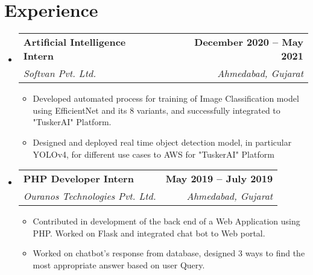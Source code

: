 \documentclass[letterpaper,11pt]{article}
\makeatletter
\newcommand{\resumeItem}[1]{
  \item\small{
    {#1 \vspace{-2pt}}
  }
}
\newcommand{\resumeSubheading}[4]{
  \vspace{-2pt}\item
    \begin{tabular*}{1.0\textwidth}[t]{l@{\extracolsep{\fill}}r}
      \textbf{#1} & \textbf{\small #2} \\
      \textit{\small#3} & \textit{\small #4} \\
    \end{tabular*}\vspace{-7pt}
}
\newcommand{\resumeSubHeadingListStart}{\begin{itemize}[leftmargin=0.0in, label={}]}
\newcommand{\resumeSubHeadingListEnd}{\end{itemize}}
\newcommand{\resumeItemListStart}{\begin{itemize}}
\newcommand{\resumeItemListEnd}{\end{itemize}\vspace{-5pt}}
\makeatother
\begin{document}
\section{Experience}
  \resumeSubHeadingListStart
    \resumeSubheading
      {Artificial Intelligence Intern}{December 2020 -- May 2021}
      {Softvan Pvt. Ltd.}{Ahmedabad, Gujarat}
      \resumeItemListStart
        \resumeItem{Developed automated process for training of Image Classification model using EfficientNet and its 8 variants, and successfully integrated to "TuskerAI" Platform.}
        \resumeItem{Designed and deployed real time object detection model, in particular YOLOv4, for different use cases to AWS for "TuskerAI" Platform}
      \resumeItemListEnd

    \resumeSubheading
      {PHP Developer Intern}{May 2019 -- July 2019}
      {Ouranos Technologies Pvt. Ltd.}{Ahmedabad, Gujarat}
      \resumeItemListStart
        \resumeItem{Contributed in development of the back end of a Web Application using PHP. Worked on Flask and integrated chat bot to Web portal.}
        \resumeItem{Worked on chatbot's response from database, designed 3 ways to find the most appropriate answer based on user Query.}
    \resumeItemListEnd
    
  \resumeSubHeadingListEnd
\vspace{-18pt}

\end{document}

